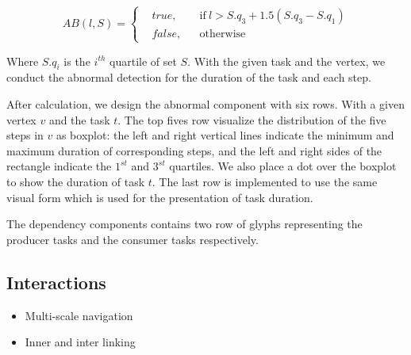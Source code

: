 \begin{equation} 
AB(l, S) = \left \{
  \begin{aligned}
    &true, && \text{if}\ l > S.q_3+1.5(S.q_3-S.q_1)\\
    &false, && \text{otherwise}
  \end{aligned} \right.
\end{equation}

Where $S.q_i$ is the $i^{th}$ quartile of set $S$. With the given task and the vertex, we conduct the abnormal detection for the duration of the task and each step. 

After calculation, we design the abnormal component with six rows. With a given vertex $v$ and the task $t$. The top fives row visualize the distribution of the five steps in $v$ as boxplot: the left and right vertical lines indicate the minimum and maximum duration of corresponding steps, and the left and right sides of the rectangle indicate the $1^{st}$ and $3^{st}$ quartiles. We also place a dot over the boxplot to show the duration of task $t$. The last row is implemented to use the same visual form which is used for the presentation of task duration.

The dependency components contains two row of glyphs representing the producer tasks and the consumer tasks respectively. 




\subsection{Interactions}
\begin{itemize}
    \item Multi-scale navigation
    \item Inner and inter linking
\end{itemize}

